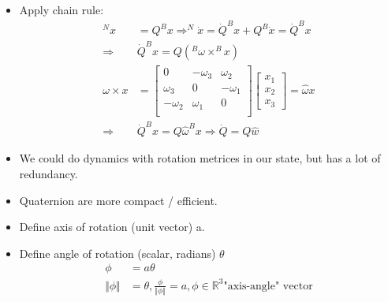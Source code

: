 \begin{itemize}
    \item Apply chain rule:
    \begin{align}
        ^N x & = Q ^B x \Rightarrow ^N \dot x = \dot Q ^B x + Q ^B \dot x = \dot Q ^B x  \\
        \Rightarrow & \dot Q ^B x = Q(^B \omega \times ^B x) \\
        \omega \times x & = 
        \begin{bmatrix}
            0 & -\omega_3 & \omega_2 \\
            \omega_3 & 0 & -\omega_1 \\
            -\omega_2 & \omega_1 & 0 \\
        \end{bmatrix}
        \begin{bmatrix}
            x_1 \\ x_2 \\ x_3
        \end{bmatrix} = \hat \omega x\\
        \Rightarrow & \dot Q ^B x = Q \hat \omega ^B x \Rightarrow \dot Q = Q \hat w
    \end{align}
    \item We could do dynamics with rotation metrices in our state, but has a lot of redundancy.
    \item Quaternion are more compact / efficient.
    \item Define axis of rotation (unit vector) a.
    \item Define angle of rotation (scalar, radians) $\theta$
    \begin{align}
        \phi & = a \theta \\
        \Vert \phi \Vert & = \theta, \frac{\phi}{\Vert \phi \Vert} = a, \phi \in \mathbb{R}^3 \text{"axis-angle" vector} 
    \end{align}


\end{itemize}

